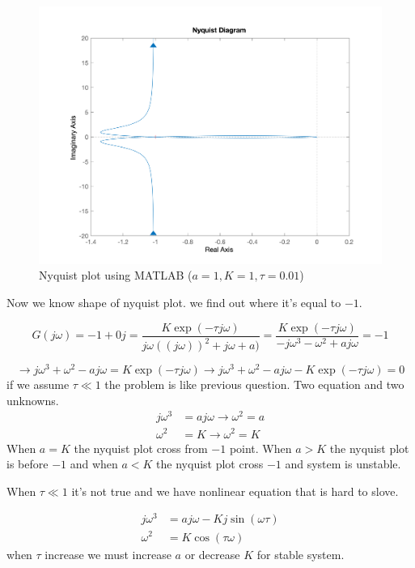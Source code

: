 \begin{figure}[H]
	\caption{Nyquist plot using MATLAB ($a = 1, K = 1, \tau = 0.01$)}
	\centering
	\includegraphics[width=12cm]{../Figure/Q3/MATLAB-Nyquist.png}
\end{figure}

Now we know shape of nyquist plot. we find out where it's equal to $-1$.

$$
G(j\omega) = -1 + 0j = \dfrac{K\exp(-\tau j\omega)}{j\omega((j\omega))^2 + j\omega + a)} = \dfrac{K\exp(-\tau j\omega)}{-j\omega^3 - \omega^2 + aj\omega} = -1
$$

$$
\to j\omega^3 + \omega^2 -aj\omega = K\exp(-\tau j\omega) \to j\omega^3 + \omega^2 -aj\omega - K\exp(-\tau j\omega) = 0
$$
if we assume $\tau \ll 1$ the problem is like previous question.
Two equation and two unknowns.
\begin{align*}
	j\omega^3 &=aj\omega \to \omega^2 = a\\
	\omega^2 &=K \to \omega^2 = K
\end{align*}
When $a = K$ the nyquist plot cross from $-1$ point. When $a>K$ the nyquist plot is before $-1$ and when $a<K$ the nyquist plot cross $-1$ and system is unstable.
 
When $\tau \ll 1$ it's not true and we have nonlinear equation that is hard to slove.

\begin{align*}
	j\omega^3 &=aj\omega - Kj\sin(\omega\tau)\\
	\omega^2 &=K\cos(\tau\omega)
\end{align*}
when $\tau$ increase we must increase $a$ or decrease $K$ for stable system.


